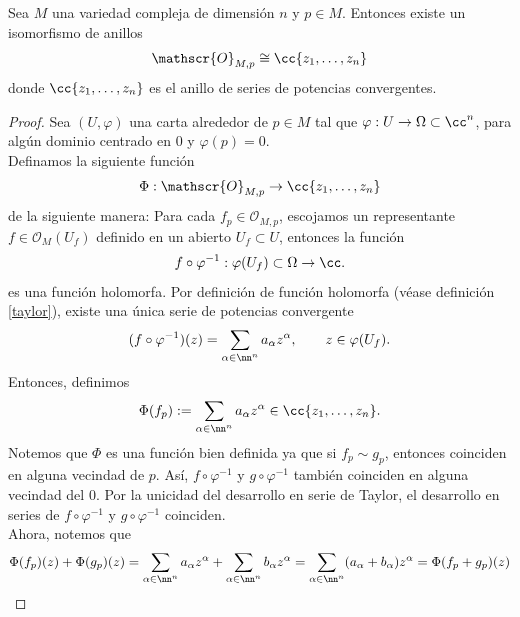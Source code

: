 	\fi
    \begin{propo}
        Sea $M$ una variedad compleja de dimensión $n$ y $p\in M$. Entonces existe un isomorfismo de anillos
        \begin{equation*}
            \mathscr{O}_{M,p}\cong \cc\{z_1,\dots,z_n\}
        \end{equation*}
        donde $\cc\{z_1,\dots,z_n\}$ es el anillo de series de potencias convergentes. 
    \end{propo}

    \begin{proof}
        Sea $(U,\varphi)$ una carta alrededor de $p\in M$ tal que $\varphi:U\to \Omega\subset \cc^n$, para algún dominio centrado en $0$ y $\varphi(p)=0$.\\
        Definamos la siguiente función
        \begin{equation*}
            \Phi:\mathscr{O}_{M,p}\to\cc\{z_1,\dots,z_n\}
        \end{equation*}
        de la siguiente manera: Para cada $f_p\in \mathscr{O}_{M,p}$, escojamos un representante $f\in\mathscr{O}_M(U_f)$ definido en un abierto $U_f\subset U$, entonces la función
        \begin{equation*}
            f\circ \varphi^{-1}:\varphi(U_f)\subset \Omega\to \cc.
        \end{equation*}
        es una función holomorfa. Por definición de función holomorfa (véase definición \ref{taylor}), existe una única serie de potencias convergente 
        \begin{equation*}
            (f\circ \varphi^{-1})(z)=\sum_{\alpha\in\nn^n} a_\alpha z^{\alpha},\qquad z\in \varphi(U_f).
        \end{equation*}
        Entonces, definimos
        \begin{equation*}
            \Phi(f_p):=\sum_{\alpha\in\nn^n} a_\alpha z^{\alpha}\in\cc\{z_1,\dots,z_n\}.
        \end{equation*}
        Notemos que $\Phi$ es una función bien definida ya que si $f_p\sim g_p$, entonces coinciden en alguna vecindad de $p$. Así, $f\circ \varphi^{-1}$ y $g\circ \varphi^{-1}$ también coinciden en alguna vecindad del $0$. Por la unicidad del desarrollo en serie de Taylor, el desarrollo en series de $f\circ \varphi^{-1}$ y $g\circ \varphi^{-1}$ coinciden.\\
        Ahora, notemos que
        \begin{align*}
            \Phi(f_p)(z)+\Phi(g_p)(z)=\sum_{\alpha\in\nn^n} a_\alpha z^{\alpha}+\sum_{\alpha\in\nn^n} b_\alpha z^{\alpha}=\sum_{\alpha\in\nn^n}(a_\alpha+b_\alpha)z^\alpha=\Phi(f_p+g_p)(z)

\end{align*}
\end{proof}
